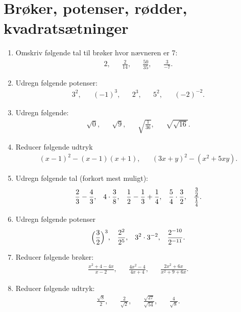 \section{ Brøker, potenser, rødder, kvadratsætninger}

\begin{enumerate}
\item Omskriv følgende tal til brøker hvor nævneren er 7:
\begin{align*}
2,&& \frac{2}{14},&&  \frac{50}{35},&& \frac{3}{-7}.%
\end{align*}

\item Udregn følgende potenser:
\begin{align*}
3^2,&& (-1)^{3},&& 2^3,&& 5^2,&& (-2)^{-2}.
\end{align*}

\item Udregn følgende:
\begin{align*}
\sqrt{0},&& \sqrt{9},&& \sqrt{\frac{1}{36}},&& \sqrt{\sqrt{16}}.
\end{align*}
\item Reducer følgende udtryk
\begin{align*}
(x-1)^2-(x-1)(x+1),&& (3x+y)^2-(x^2+5xy).
\end{align*}

\item Udregn følgende tal (forkort mest muligt):
\begin{align*}
\frac{2}{3}-\frac{4}{3},&&4\cdot\frac{3}{8},&& \frac{1}{2}-\frac{1}{3}+\frac{1}{4},&& \frac{5}{4}\cdot \frac{3}{2},&& \frac{\frac{3}{2}}{\frac{1}{4}}.
\end{align*}

\item Udregn følgende potenser
\begin{align*}
\Big(\frac{3}{2}\Big)^3,&& \frac{2^2}{2^5},&& 3^2\cdot 3^{-2},&& \frac{2^{-10}}{2^{-11}}.
\end{align*}

\item Reducer følgende brøker:
\begin{align*}
\frac{x^2+4-4x}{x-2},&& \frac{4x^2-4}{4x+4},&&\frac{2x^2+6x}{x^2+9+6x}.
\end{align*}

\item Reducer følgende udtryk:
\begin{align*}
\frac{\sqrt{8}}{2},&& \frac{2}{\sqrt{2}},&& \frac{\sqrt{27}}{\sqrt{54}},&& \frac{4}{\sqrt{8}}.
\end{align*}


\end{enumerate}
